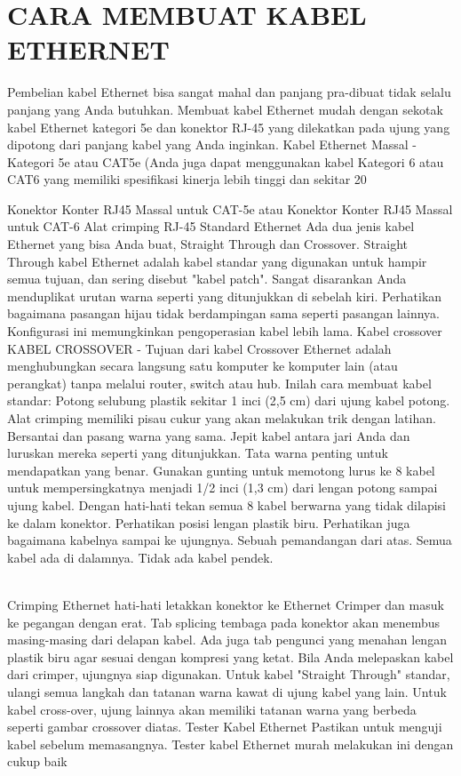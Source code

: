 \section{CARA MEMBUAT KABEL ETHERNET}

Pembelian kabel Ethernet bisa sangat mahal dan panjang pra-dibuat tidak selalu panjang yang Anda butuhkan. Membuat kabel Ethernet mudah dengan sekotak kabel 
Ethernet kategori 5e dan konektor RJ-45 yang dilekatkan pada ujung yang dipotong dari panjang kabel yang Anda inginkan.
Kabel Ethernet Massal - Kategori 5e atau CAT5e
(Anda juga dapat menggunakan kabel Kategori 6 atau CAT6 yang memiliki spesifikasi kinerja lebih tinggi dan sekitar 20%

Konektor Konter RJ45 Massal untuk CAT-5e atau Konektor Konter RJ45 Massal untuk CAT-6
Alat crimping RJ-45
Standard Ethernet Ada dua jenis kabel Ethernet yang bisa Anda buat, Straight Through dan Crossover.
Straight Through kabel Ethernet adalah kabel standar yang digunakan untuk hampir semua tujuan, dan sering disebut "kabel patch". Sangat disarankan Anda 
menduplikat urutan warna seperti yang ditunjukkan di sebelah kiri. Perhatikan bagaimana pasangan hijau tidak berdampingan sama seperti pasangan lainnya. 
Konfigurasi ini memungkinkan pengoperasian kabel lebih lama.
Kabel crossover
KABEL CROSSOVER - Tujuan dari kabel Crossover Ethernet adalah menghubungkan secara langsung satu komputer ke komputer lain (atau perangkat) tanpa melalui 
router, switch atau hub.
Inilah cara membuat kabel standar:
Potong selubung plastik sekitar 1 inci (2,5 cm) dari ujung kabel potong. Alat crimping memiliki pisau cukur yang akan melakukan trik dengan latihan.
Bersantai dan pasang warna yang sama.
Jepit kabel antara jari Anda dan luruskan mereka seperti yang ditunjukkan. Tata warna penting untuk mendapatkan yang benar.
Gunakan gunting untuk memotong lurus ke 8 kabel untuk mempersingkatnya menjadi 1/2 inci (1,3 cm) dari lengan potong sampai ujung kabel.
Dengan hati-hati tekan semua 8 kabel berwarna yang tidak dilapisi ke dalam konektor. Perhatikan posisi lengan plastik biru. Perhatikan juga bagaimana kabelnya
 sampai ke ujungnya.
Sebuah pemandangan dari atas. Semua kabel ada di dalamnya. Tidak ada kabel pendek.
 

\\Crimping Ethernet
hati-hati letakkan konektor ke Ethernet Crimper dan masuk ke pegangan dengan erat. Tab splicing tembaga pada konektor akan menembus masing-masing dari delapan 
kabel. Ada juga tab pengunci yang menahan lengan plastik biru agar sesuai dengan kompresi yang ketat. Bila Anda melepaskan kabel dari crimper, ujungnya siap 
digunakan.
Untuk kabel "Straight Through" standar, ulangi semua langkah dan tatanan warna kawat di ujung kabel yang lain. Untuk kabel cross-over, ujung lainnya akan 
memiliki tatanan warna yang berbeda seperti gambar crossover diatas.
Tester Kabel Ethernet
Pastikan untuk menguji kabel sebelum memasangnya. Tester kabel Ethernet murah melakukan ini dengan cukup baik

\cite{caniggia2003common}
\cite{jakovljevic2008common}
\cite{ueda2011transmission}
\cite{gagnon2002cable}
\cite{ueda2011transmission}
\cite{gomez2003receive}
\cite{blouin2002cross}